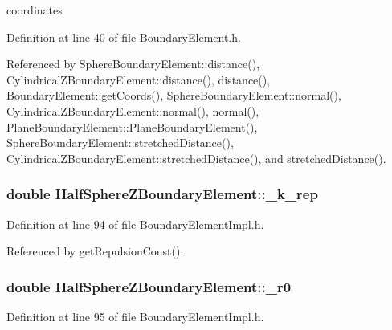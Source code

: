 coordinates 



Definition at line 40 of file Boundary\+Element.\+h.



Referenced by Sphere\+Boundary\+Element\+::distance(), Cylindrical\+Z\+Boundary\+Element\+::distance(), distance(), Boundary\+Element\+::get\+Coords(), Sphere\+Boundary\+Element\+::normal(), Cylindrical\+Z\+Boundary\+Element\+::normal(), normal(), Plane\+Boundary\+Element\+::\+Plane\+Boundary\+Element(), Sphere\+Boundary\+Element\+::stretched\+Distance(), Cylindrical\+Z\+Boundary\+Element\+::stretched\+Distance(), and stretched\+Distance().

\hypertarget{classHalfSphereZBoundaryElement_aaafd14a29987646f9537a7248ba6291b}{
\subsubsection[{\+\_\+k\+\_\+rep}]{\setlength{\rightskip}{0pt plus 5cm}double Half\+Sphere\+Z\+Boundary\+Element\+::\+\_\+k\+\_\+rep\hspace{0.3cm}{\ttfamily [private]}}}\label{classHalfSphereZBoundaryElement_aaafd14a29987646f9537a7248ba6291b}


Definition at line 94 of file Boundary\+Element\+Impl.\+h.



Referenced by get\+Repulsion\+Const().

\hypertarget{classHalfSphereZBoundaryElement_afa790cdbea557aa8615188211acaedce}{
\subsubsection[{\+\_\+r0}]{\setlength{\rightskip}{0pt plus 5cm}double Half\+Sphere\+Z\+Boundary\+Element\+::\+\_\+r0\hspace{0.3cm}{\ttfamily [private]}}}\label{classHalfSphereZBoundaryElement_afa790cdbea557aa8615188211acaedce}


Definition at line 95 of file Boundary\+Element\+Impl.\+h.



